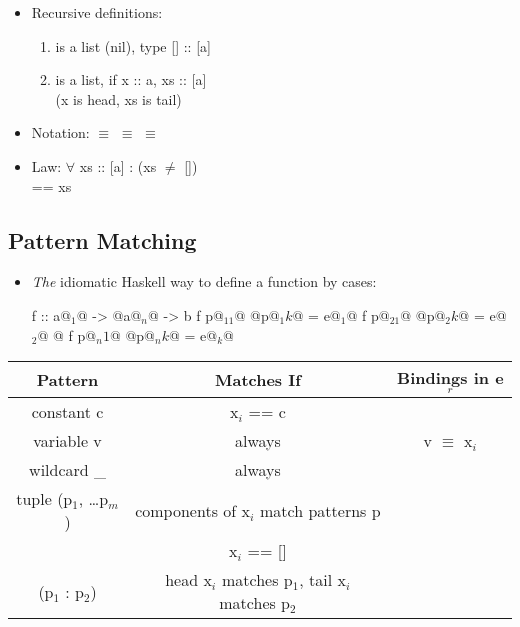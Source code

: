 \begin{itemize}
  \item Recursive definitions:
  \begin{enumerate}
      \item \codeline{[]} is a list (nil), type [] :: [a]
      \item {} is a list, if x :: a, xs :: [a] \\ (x is head, xs is tail)
  \end{enumerate}
  \item Notation:  $\equiv$  $\equiv$ \codeline{[3,2,1]} $\equiv$ 
  \item Law: $\forall$ xs :: [a] :   \hspace{1cm} (xs $\neq$ []) \\
       == xs
\end{itemize}




\subsection{Pattern Matching}

\begin{itemize}
  \item \textit{The} idiomatic Haskell way to define a function by cases:
  \begin{codebox}[haskell]
f :: a@$_1$@ -> @\dots@ a@$_n$@ -> b
f p@$_11$@ @\dots@ p@$_1k$@ = e@$_1$@
f p@$_21$@ @\dots@ p@$_2k$@ = e@$_2$@
@\dots@
f p@$_n1$@ @\dots@ p@$_nk$@ = e@$_k$@
  \end{codebox}

\end{itemize}

\vspace{9pt}\begin{center}\begin{tabular}{|c|c|c|}\hline
\rowcolor{grau}   Pattern         & Matches If                & Bindings in e$_r$     \\\hline
                  constant c      & x$_i$ == c                  &                     \\\hline
                  variable v      & always                    & v $\equiv$ x$_i$      \\\hline
                  wildcard \_      & always                    &                       \\\hline
                  tuple (p$_1$, \dots p$_m$)  & components of x$_i$ match patterns p    & \\\hline
                  []              & x$_i$ == []                 &                     \\\hline
                  (p$_1$ : p$_2$)     & head x$_i$ matches p$_1$, tail x$_i$ matches p$_2$    & \\\hline
\end{tabular}\end{center}\vspace{9pt}


